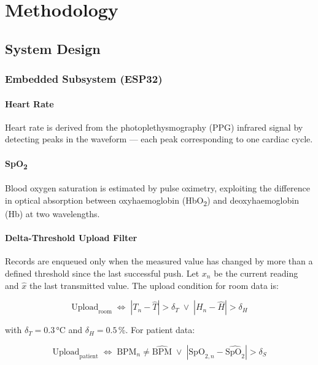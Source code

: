 \chapter{Methodology}

\section{System Design}

\subsection{Embedded Subsystem (ESP32)}

\subsubsection{Heart Rate}

Heart rate is derived from the photoplethysmography (PPG) infrared signal by detecting
peaks in the waveform — each peak corresponding to one cardiac cycle.

\subsubsection{SpO\textsubscript{2}}

Blood oxygen saturation is estimated by pulse oximetry, exploiting the difference in
optical absorption between oxyhaemoglobin (HbO\textsubscript{2}) and deoxyhaemoglobin
(Hb) at two wavelengths.

\subsubsection{Delta-Threshold Upload Filter}

Records are enqueued only when the measured value has changed by more than a defined
threshold since the last successful push.
Let $x_n$ be the current reading and $\hat{x}$ the last transmitted value.
The upload condition for room data is:

\begin{equation}
	\text{Upload}_{\text{room}} \;\Leftrightarrow\;
	\left| T_n - \hat{T} \right| > \delta_T \;\lor\;
	\left| H_n - \hat{H} \right| > \delta_H
	\label{eq:room_thresh}
\end{equation}

with $\delta_T = 0.3$\,°C and $\delta_H = 0.5$\,\%.
For patient data:

\begin{equation}
	\text{Upload}_{\text{patient}} \;\Leftrightarrow\;
	\text{BPM}_n \neq \hat{\text{BPM}} \;\lor\;
	\left| \text{SpO}_{2,n} - \widehat{\text{SpO}_2} \right| > \delta_S
	\label{eq:patient_thresh}
\end{equation}

